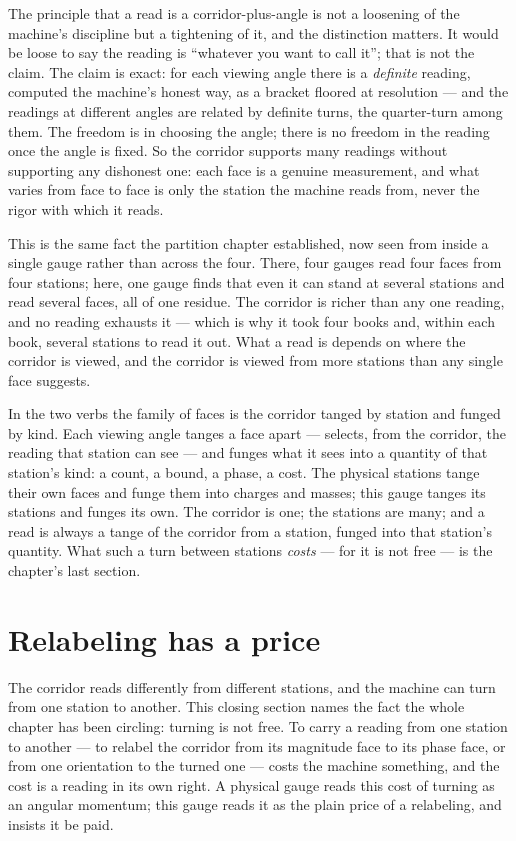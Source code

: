 The principle that a read is a corridor-plus-angle is not a loosening of the machine's discipline but a tightening of it,
and the distinction matters. It would be loose to say the reading is ``whatever you want to call it''; that is not the
claim. The claim is exact: for each viewing angle there is a \emph{definite} reading, computed the machine's honest way,
as a bracket floored at resolution --- and the readings at different angles are related by definite turns, the
quarter-turn among them. The freedom is in choosing the angle; there is no freedom in the reading once the angle is
fixed. So the corridor supports many readings without supporting any dishonest one: each face is a genuine measurement,
and what varies from face to face is only the station the machine reads from, never the rigor with which it reads.

This is the same fact the partition chapter established, now seen from inside a single gauge rather than across the four.
There, four gauges read four faces from four stations; here, one gauge finds that even it can stand at several stations
and read several faces, all of one residue. The corridor is richer than any one reading, and no reading exhausts it ---
which is why it took four books and, within each book, several stations to read it out. What a read is depends on where
the corridor is viewed, and the corridor is viewed from more stations than any single face suggests.

In the two verbs the family of faces is the corridor tanged by station and funged by kind. Each viewing angle tanges a
face apart --- selects, from the corridor, the reading that station can see --- and funges what it sees into a quantity of
that station's kind: a count, a bound, a phase, a cost. The physical stations tange their own faces and funge them into
charges and masses; this gauge tanges its stations and funges its own. The corridor is one; the stations are many; and a
read is always a tange of the corridor from a station, funged into that station's quantity. What such a turn between
stations \emph{costs} --- for it is not free --- is the chapter's last section.

\section{Relabeling has a price}

The corridor reads differently from different stations, and the machine can turn from one station to another. This
closing section names the fact the whole chapter has been circling: turning is not free. To carry a reading from one
station to another --- to relabel the corridor from its magnitude face to its phase face, or from one orientation to the
turned one --- costs the machine something, and the cost is a reading in its own right. A physical gauge reads this cost
of turning as an angular momentum; this gauge reads it as the plain price of a relabeling, and insists it be paid.

